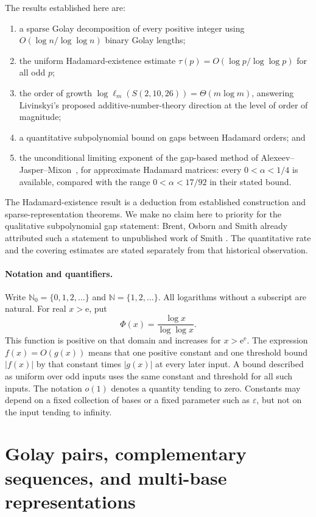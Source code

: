 \documentclass[11pt]{article}
\newcommand{\N}{\mathbb{N}}
\newcommand{\ee}{\mathrm{e}}
\newcommand{\scale}{\Phi}
\begin{document}
The results established here are:
\begin{enumerate}
\item a sparse Golay decomposition of every positive integer using $O(\log n/\log\log n)$ binary Golay lengths;
\item the uniform Hadamard-existence estimate $\tau(p)=O(\log p/\log\log p)$ for all odd $p$;
\item the order of growth $\log \ell_m(S(2,10,26))=\Theta(m\log m)$, answering Livinskyi's proposed additive-number-theory direction at the level of order of magnitude;
\item a quantitative subpolynomial bound on gaps between Hadamard orders; and
\item the unconditional limiting exponent of the gap-based method of Alexeev--Jasper--Mixon~\cite{Alexeev2025}, for approximate Hadamard matrices: every $0<\alpha<1/4$ is available, compared with the range $0<\alpha<17/92$ in their stated bound.
\end{enumerate}

The Hadamard-existence result is a deduction from established construction
and sparse-representation theorems. We make no claim here to priority for
the qualitative subpolynomial gap statement: Brent, Osborn and Smith
already attributed such a statement to unpublished work of Smith
\cite{Brent2013}. The quantitative rate and the covering estimates are stated
separately from that historical observation.

\paragraph{Notation and quantifiers.}
Write $\N_0=\{0,1,2,\ldots\}$ and $\N=\{1,2,\ldots\}$. All logarithms
without a subscript are natural. For real $x>\ee$, put
\[
\scale(x)=\frac{\log x}{\log\log x}.
\]
This function is positive on that domain and increases for $x>\ee^{\ee}$.
The expression $f(x)=O(g(x))$ means that one positive constant and one
threshold bound $|f(x)|$ by that constant times $|g(x)|$ at every later
input. A bound described as uniform over odd inputs uses the same constant
and threshold for all such inputs. The notation $o(1)$ denotes a quantity
tending to zero. Constants may depend on a fixed collection of bases or a
fixed parameter such as $\varepsilon$, but not on the input tending to infinity.

\section{Golay pairs, complementary sequences, and multi-base representations}
\end{document}
